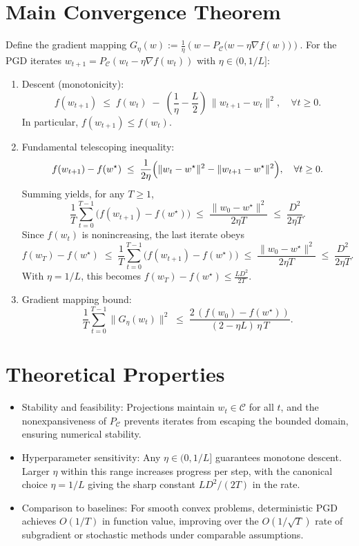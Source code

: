 \documentclass[11pt]{article}
\begin{document}
\section*{Main Convergence Theorem}
Define the gradient mapping $G_\eta(w):=\tfrac{1}{\eta}\left(w - P_{\mathcal{C}}\bigl(w - \eta \nabla f(w)\bigr)\right)$. For the PGD iterates $w_{t+1}=P_{\mathcal{C}}(w_t - \eta \nabla f(w_t))$ with $\eta\in(0,1/L]$:
\begin{enumerate}
\item Descent (monotonicity):
\[
f(w_{t+1}) \;\le\; f(w_t) \;-\; \left(\frac{1}{\eta}-\frac{L}{2}\right)\,\|w_{t+1}-w_t\|^2,\quad\forall t\ge 0.
\]
In particular, $f(w_{t+1})\le f(w_t)$.
\item Fundamental telescoping inequality:
\[
f(w_{t+1})-f(w^\star) \;\le\; \frac{1}{2\eta}\Bigl(\|w_t-w^\star\|^2 - \|w_{t+1}-w^\star\|^2\Bigr),\quad\forall t\ge 0.
\]
Summing yields, for any $T\ge 1$,
\[
\frac{1}{T}\sum_{t=0}^{T-1}\bigl(f(w_{t+1})-f(w^\star)\bigr) \;\le\; \frac{\|w_0-w^\star\|^2}{2\eta T}
\;\le\; \frac{D^2}{2\eta T}.
\]
Since $f(w_t)$ is nonincreasing, the last iterate obeys
\[
f(w_T)-f(w^\star) \;\le\; \frac{1}{T}\sum_{t=0}^{T-1}\bigl(f(w_{t+1})-f(w^\star)\bigr)
\;\le\; \frac{\|w_0-w^\star\|^2}{2\eta T}
\;\le\; \frac{D^2}{2\eta T}.
\]
With $\eta=1/L$, this becomes $f(w_T)-f(w^\star)\le \tfrac{L D^2}{2T}$.
\item Gradient mapping bound:
\[
\frac{1}{T}\sum_{t=0}^{T-1}\|G_\eta(w_t)\|^2 \;\le\; \frac{2\,(f(w_0)-f(w^\star))}{(2-\eta L)\,\eta\, T}.
\]
\end{enumerate}

\section*{Theoretical Properties}
\begin{itemize}
\item Stability and feasibility: Projections maintain $w_t\in\mathcal{C}$ for all $t$, and the nonexpansiveness of $P_{\mathcal{C}}$ prevents iterates from escaping the bounded domain, ensuring numerical stability.
\item Hyperparameter sensitivity: Any $\eta\in(0,1/L]$ guarantees monotone descent. Larger $\eta$ within this range increases progress per step, with the canonical choice $\eta=1/L$ giving the sharp constant $L D^2/(2T)$ in the rate.
\item Comparison to baselines: For smooth convex problems, deterministic PGD achieves $O(1/T)$ in function value, improving over the $O(1/\sqrt{T})$ rate of subgradient or stochastic methods under comparable assumptions.
\end{itemize}
\end{document}
